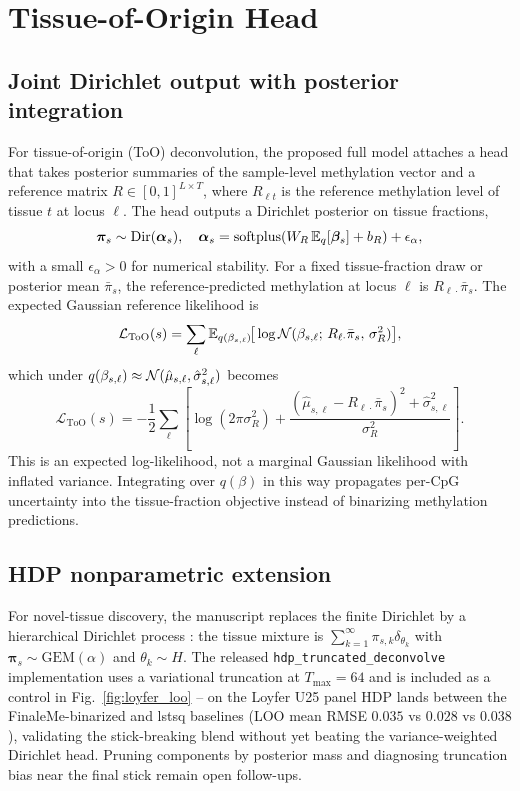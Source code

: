 \section{Tissue-of-Origin Head}
\label{sec:too}

\subsection{Joint Dirichlet output with posterior integration}
For tissue-of-origin (ToO) deconvolution, the proposed full model attaches a head that takes posterior summaries of the sample-level methylation vector and a reference matrix $R\in[0,1]^{L\times T}$, where $R_{\ell t}$ is the reference methylation level of tissue $t$ at locus $\ell$. The head outputs a Dirichlet posterior on tissue fractions,
\begin{equation}
\bm{\pi}_s\sim\mathrm{Dir}(\bm{\alpha}_s),\quad \bm{\alpha}_s = \operatorname{softplus}(W_R\,\mathbb{E}_q[\boldsymbol{\beta}_s] + b_R)+\epsilon_\alpha,
\end{equation}
with a small $\epsilon_\alpha>0$ for numerical stability. For a fixed tissue-fraction draw or posterior mean $\bar\pi_s$, the reference-predicted methylation at locus $\ell$ is $R_{\ell\cdot}\bar\pi_s$. The expected Gaussian reference likelihood is
\begin{equation}
\mathcal{L}_{\mathrm{ToO}}(s) = \sum_\ell \mathbb{E}_{q(\beta_{s,\ell})}\!\big[\log\mathcal{N}(\beta_{s,\ell};\,R_{\ell\cdot}\bar\pi_s,\,\sigma_R^2)\big],
\end{equation}
which under $q(\beta_{s,\ell})\approx\mathcal{N}(\hat\mu_{s,\ell},\hat\sigma^2_{s,\ell})$ becomes
\begin{equation}
\mathcal{L}_{\mathrm{ToO}}(s) = -\frac{1}{2}\sum_\ell\left[\log(2\pi\sigma_R^2)+\frac{(\hat\mu_{s,\ell}-R_{\ell\cdot}\bar\pi_s)^2+\hat\sigma^2_{s,\ell}}{\sigma_R^2}\right].
\label{eq:too-expected}
\end{equation}
This is an expected log-likelihood, not a marginal Gaussian likelihood with inflated variance. Integrating over $q(\beta)$ in this way propagates per-CpG uncertainty into the tissue-fraction objective instead of binarizing methylation predictions.

\subsection{HDP nonparametric extension}
For novel-tissue discovery, the manuscript replaces the finite Dirichlet by a hierarchical Dirichlet process \citep{teh2006hdp,bleijordan2006variationaldp}: the tissue mixture is $\sum_{k=1}^\infty \pi_{s,k}\delta_{\theta_k}$ with $\bm\pi_s\sim\mathrm{GEM}(\alpha)$ and $\theta_k\sim H$. The released \texttt{hdp\_truncated\_deconvolve} implementation uses a variational truncation at $T_{\max}=64$ and is included as a control in Fig.~\ref{fig:loyfer_loo} -- on the Loyfer U25 panel HDP lands between the FinaleMe-binarized and lstsq baselines (LOO mean RMSE $0.035$ vs $0.028$ vs $0.038$), validating the stick-breaking blend without yet beating the variance-weighted Dirichlet head. Pruning components by posterior mass and diagnosing truncation bias near the final stick remain open follow-ups.

